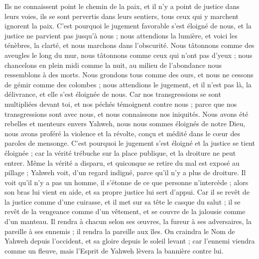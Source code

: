 \begin{multicols}{2}
Ils ne connaissent point le chemin de la paix, et il n'y a point de justice dans leurs voies, ils se sont pervertis dans leurs sentiers, tous ceux qui y marchent ignorent la paix.
C'est pourquoi le jugement favorable s'est éloigné de nous, et la justice ne parvient pas jusqu'à nous ; nous attendions la lumière, et voici les ténèbres, la clarté, et nous marchons dans l'obscurité.
Nous tâtonnons comme des aveugles le long du mur, nous tâtonnons comme ceux qui n'ont pas d'yeux ; nous chancelons en plein midi comme la nuit, au milieu de l'abondance nous ressemblons à des morts.
Nous grondons tous comme des ours, et nous ne cessons de gémir comme des colombes ; nous attendions le jugement, et il n'est pas là, la délivrance, et elle s'est éloignée de nous.
Car nos transgressions se sont multipliées devant toi, et nos péchés témoignent contre nous ; parce que nos transgressions sont avec nous, et nous connaissons nos iniquités.
Nous avons été rebelles et menteurs envers Yahweh, nous nous sommes éloignés de notre Dieu, nous avons proféré la violence et la révolte, conçu et médité dans le cœur des paroles de mensonge.
C'est pourquoi le jugement s'est éloigné et la justice se tient éloignée ; car la vérité trébuche sur la place publique, et la droiture ne peut entrer.
Même la vérité a disparu, et quiconque se retire du mal est exposé au pillage ; Yahweh voit, d'un regard indigné, parce qu'il n'y a plus de droiture.
Il voit qu'il n'y a pas un homme, il s'étonne de ce que personne n'intercède ; alors son bras lui vient en aide, et sa propre justice lui sert d'appui.
Car il se revêt de la justice comme d'une cuirasse, et il met sur sa tête le casque du salut ; il se revêt de la vengeance comme d'un vêtement, et se couvre de la jalousie comme d'un manteau.
Il rendra à chacun selon ses œuvres, la fureur à ses adversaires, la pareille à ses ennemis ; il rendra la pareille aux îles.
On craindra le Nom de Yahweh depuis l'occident, et sa gloire depuis le soleil levant ; car l'ennemi viendra comme un fleuve, mais l'Esprit de Yahweh lèvera la bannière contre lui.

\end{multicols}
